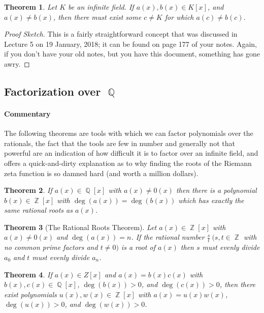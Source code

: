\documentclass[letterpaper, 12pt]{article}
\DeclareMathOperator{\Z}{\mathbb{Z}}
\DeclareMathOperator{\Q}{\mathbb{Q}}
\newtheorem{thm}{Theorem}
\begin{document}
			\begin{thm}
			Let $K$ be an infinite field. 
			If $a(x),b(x) \in K[x]$, and $a(x) \neq b(x)$, then there must exist some $c \neq K$ for which $a(c) \neq b(c).$
			\end{thm}
			\color{blue}
			\begin{proof}[Proof Sketch]
			This is a fairly straightforward concept that was discussed in Lecture 5 on 19 January, 2018; it can be found on page 177 of your notes.
			Again, if you don't have your old notes, but you have this document, something has gone awry.
			\end{proof}
			\color{black}

		\subsection{Factorization over $\Q$}
		\label{sec:factorization_over_q}
			\paragraph{\color{blue}Commentary}
			\color{blue}
			The following theorems are tools with which we can factor polynomials over the rationals, the fact that the tools are few in number and generally not that powerful are an indication of how difficult it is to factor over an infinite field, and offers a quick-and-dirty explanation as to why finding the roots of the Riemann zeta function is so damned hard (and worth a million dollars).
			\color{black}

			\begin{thm}
			If $a(x) \in \Q[x]$ with $a(x) \neq 0(x)$ then there is a polynomial $b(x) \in \Z[x]$ with $\deg(a(x)) = \deg(b(x))$ which has exactly the same rational roots as $a(x)$.
			\end{thm}

			\setcounter{thm}{30}
			\begin{thm}[The Rational Roots Theorem]
			Let $a(x) \in \Z[x]$ with $a(x) \neq 0(x)$ and $\deg(a(x)) = n$. 
			If the rational number $\frac{s}{t} \ (s,t \in \Z$ with no common prime factors and $t \neq 0)$ is a root of $a(x)$ then $s$ must evenly divide $a_{0}$ and $t$ must evenly divide $a_{n}$.
			\end{thm}

			\setcounter{thm}{32}
			\begin{thm}
			If $a(x) \in Z[x]$ and $a(x) = b(x)c(x)$ with $b(x),c(x) \in \Q[x]$, $\deg(b(x)) > 0$, and $\deg(c(x)) > 0$, then there exist polynomials $u(x), w(x) \in \Z[x]$ with $a(x) = u(x)w(x)$, $\deg(u(x)) > 0$, and $\deg(w(x)) > 0$.
			\end{thm}
\end{document}
